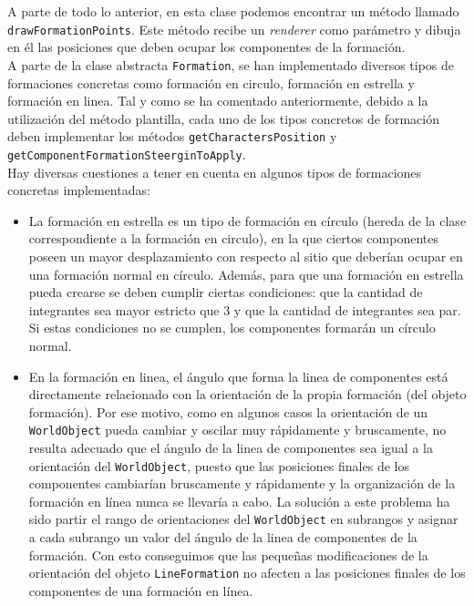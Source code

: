 A parte de todo lo anterior, en esta clase podemos encontrar un método llamado \texttt{drawFormationPoints}. Este método recibe un \textit{renderer} como parámetro y dibuja en él las posiciones que deben ocupar los componentes de la formación. \\

A parte de la clase abstracta \texttt{Formation}, se han implementado diversos tipos de formaciones concretas como formación en circulo, formación en estrella y formación en linea. Tal y como se ha comentado anteriormente, debido a la utilización del método plantilla, cada uno de los tipos concretos de formación deben implementar los métodos \texttt{getCharactersPosition} y \texttt{getComponentFormationSteerginToApply}. \\

Hay diversas cuestiones a tener en cuenta en algunos tipos de formaciones concretas implementadas:
\begin{itemize}
	\item La formación en estrella es un tipo de formación en círculo (hereda de la clase correspondiente a la formación en circulo), en la que ciertos componentes poseen un mayor desplazamiento con respecto al sitio que deberían ocupar en una formación normal en círculo. Además, para que una formación en estrella pueda crearse se deben cumplir ciertas condiciones: que la cantidad de integrantes sea mayor estricto que 3 y que la cantidad de integrantes sea par. Si estas condiciones no se cumplen, los componentes formarán un círculo normal.
	\item En la formación en linea, el ángulo que forma la linea de componentes está directamente relacionado con la orientación de la propia formación (del objeto formación). Por ese motivo, como en algunos casos la orientación de un \texttt{WorldObject} pueda cambiar y oscilar muy rápidamente y bruscamente, no resulta adecuado que el ángulo de la linea de componentes sea igual a la orientación del \texttt{WorldObject}, puesto que las posiciones finales de los componentes cambiarían bruscamente y rápidamente y la organización de la formación en línea nunca se llevaría a cabo. La solución a este problema ha sido partir el rango de orientaciones del \texttt{WorldObject} en subrangos y asignar a cada subrango un valor del ángulo de la linea de componentes de la formación. Con esto conseguimos que las pequeñas modificaciones de la orientación del objeto \texttt{LineFormation} no afecten a las posiciones finales de los componentes de una formación en línea.
\end{itemize}

